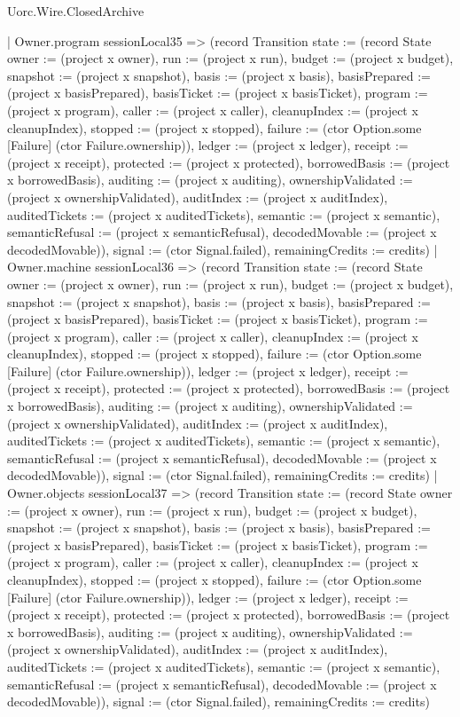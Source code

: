 \begin{lexlean}{Uorc.Wire.ClosedArchive}
\begin{semanticmodule}
{    | Owner.program sessionLocal35 => (record Transition {state := (record State {owner := (project x owner), run := (project x run), budget := (project x budget), snapshot := (project x snapshot), basis := (project x basis), basisPrepared := (project x basisPrepared), basisTicket := (project x basisTicket), program := (project x program), caller := (project x caller), cleanupIndex := (project x cleanupIndex), stopped := (project x stopped), failure := (ctor Option.some [Failure] (ctor Failure.ownership)), ledger := (project x ledger), receipt := (project x receipt), protected := (project x protected), borrowedBasis := (project x borrowedBasis), auditing := (project x auditing), ownershipValidated := (project x ownershipValidated), auditIndex := (project x auditIndex), auditedTickets := (project x auditedTickets), semantic := (project x semantic), semanticRefusal := (project x semanticRefusal), decodedMovable := (project x decodedMovable)}), signal := (ctor Signal.failed), remainingCredits := credits})
    | Owner.machine sessionLocal36 => (record Transition {state := (record State {owner := (project x owner), run := (project x run), budget := (project x budget), snapshot := (project x snapshot), basis := (project x basis), basisPrepared := (project x basisPrepared), basisTicket := (project x basisTicket), program := (project x program), caller := (project x caller), cleanupIndex := (project x cleanupIndex), stopped := (project x stopped), failure := (ctor Option.some [Failure] (ctor Failure.ownership)), ledger := (project x ledger), receipt := (project x receipt), protected := (project x protected), borrowedBasis := (project x borrowedBasis), auditing := (project x auditing), ownershipValidated := (project x ownershipValidated), auditIndex := (project x auditIndex), auditedTickets := (project x auditedTickets), semantic := (project x semantic), semanticRefusal := (project x semanticRefusal), decodedMovable := (project x decodedMovable)}), signal := (ctor Signal.failed), remainingCredits := credits})
    | Owner.objects sessionLocal37 => (record Transition {state := (record State {owner := (project x owner), run := (project x run), budget := (project x budget), snapshot := (project x snapshot), basis := (project x basis), basisPrepared := (project x basisPrepared), basisTicket := (project x basisTicket), program := (project x program), caller := (project x caller), cleanupIndex := (project x cleanupIndex), stopped := (project x stopped), failure := (ctor Option.some [Failure] (ctor Failure.ownership)), ledger := (project x ledger), receipt := (project x receipt), protected := (project x protected), borrowedBasis := (project x borrowedBasis), auditing := (project x auditing), ownershipValidated := (project x ownershipValidated), auditIndex := (project x auditIndex), auditedTickets := (project x auditedTickets), semantic := (project x semantic), semanticRefusal := (project x semanticRefusal), decodedMovable := (project x decodedMovable)}), signal := (ctor Signal.failed), remainingCredits := credits})
}
\end{semanticmodule}
\end{lexlean}
